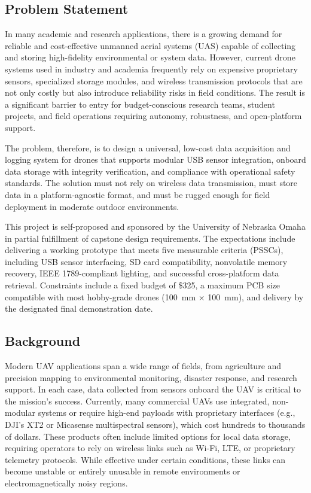 \documentclass[12pt]{article}
\begin{document}
\subsection{Problem Statement}
In many academic and research applications, there is a growing demand for reliable and cost-effective unmanned aerial systems (UAS) capable of collecting and storing high-fidelity environmental or system data. However, current drone systems used in industry and academia frequently rely on expensive proprietary sensors, specialized storage modules, and wireless transmission protocols that are not only costly but also introduce reliability risks in field conditions. The result is a significant barrier to entry for budget-conscious research teams, student projects, and field operations requiring autonomy, robustness, and open-platform support.

The problem, therefore, is to design a universal, low-cost data acquisition and logging system for drones that supports modular USB sensor integration, onboard data storage with integrity verification, and compliance with operational safety standards. The solution must not rely on wireless data transmission, must store data in a platform-agnostic format, and must be rugged enough for field deployment in moderate outdoor environments.

This project is self-proposed and sponsored by the University of Nebraska Omaha in partial fulfillment of capstone design requirements. The expectations include delivering a working prototype that meets five measurable criteria (PSSCs), including USB sensor interfacing, SD card compatibility, nonvolatile memory recovery, IEEE 1789-compliant lighting, and successful cross-platform data retrieval. Constraints include a fixed budget of \$325, a maximum PCB size compatible with most hobby-grade drones (100~mm × 100~mm), and delivery by the designated final demonstration date.

\subsection{Background}

Modern UAV applications span a wide range of fields, from agriculture and precision mapping to environmental monitoring, disaster response, and research support. In each case, data collected from sensors onboard the UAV is critical to the mission's success. Currently, many commercial UAVs use integrated, non-modular systems or require high-end payloads with proprietary interfaces (e.g., DJI’s XT2 or Micasense multispectral sensors), which cost hundreds to thousands of dollars. These products often include limited options for local data storage, requiring operators to rely on wireless links such as Wi-Fi, LTE, or proprietary telemetry protocols. While effective under certain conditions, these links can become unstable or entirely unusable in remote environments or electromagnetically noisy regions.
\end{document}
